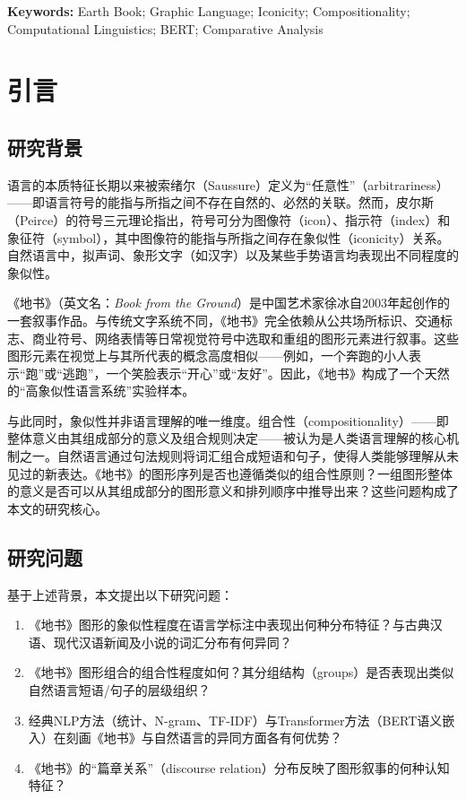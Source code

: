 \documentclass[a4paper,12pt]{article}
\begin{document}
\textbf{Keywords:} Earth Book; Graphic Language; Iconicity; Compositionality; Computational Linguistics; BERT; Comparative Analysis

\newpage
\tableofcontents
\newpage

\section{引言}\label{sec:intro}

\subsection{研究背景}

语言的本质特征长期以来被索绪尔（Saussure）定义为``任意性''（arbitrariness）——即语言符号的能指与所指之间不存在自然的、必然的关联\cite{saussure1916}。然而，皮尔斯（Peirce）的符号三元理论指出，符号可分为图像符（icon）、指示符（index）和象征符（symbol），其中图像符的能指与所指之间存在象似性（iconicity）关系\cite{peirce1931}。自然语言中，拟声词、象形文字（如汉字）以及某些手势语言均表现出不同程度的象似性。

《地书》（英文名：\textit{Book from the Ground}）是中国艺术家徐冰自2003年起创作的一套叙事作品\cite{xubing2012}。与传统文字系统不同，《地书》完全依赖从公共场所标识、交通标志、商业符号、网络表情等日常视觉符号中选取和重组的图形元素进行叙事。这些图形元素在视觉上与其所代表的概念高度相似——例如，一个奔跑的小人表示``跑''或``逃跑''，一个笑脸表示``开心''或``友好''。因此，《地书》构成了一个天然的``高象似性语言系统''实验样本。

与此同时，象似性并非语言理解的唯一维度。组合性（compositionality）——即整体意义由其组成部分的意义及组合规则决定——被认为是人类语言理解的核心机制之一\cite{frege1892,montague1970}。自然语言通过句法规则将词汇组合成短语和句子，使得人类能够理解从未见过的新表达。《地书》的图形序列是否也遵循类似的组合性原则？一组图形整体的意义是否可以从其组成部分的图形意义和排列顺序中推导出来？这些问题构成了本文的研究核心。

\subsection{研究问题}

基于上述背景，本文提出以下研究问题：

\begin{enumerate}[label=\textbf{RQ\arabic*:},leftmargin=2cm]
    \item 《地书》图形的象似性程度在语言学标注中表现出何种分布特征？与古典汉语、现代汉语新闻及小说的词汇分布有何异同？
    \item 《地书》图形组合的组合性程度如何？其分组结构（groups）是否表现出类似自然语言短语/句子的层级组织？
    \item 经典NLP方法（统计、N-gram、TF-IDF）与Transformer方法（BERT语义嵌入）在刻画《地书》与自然语言的异同方面各有何优势？
    \item 《地书》的``篇章关系''（discourse relation）分布反映了图形叙事的何种认知特征？
\end{enumerate}
\end{document}
